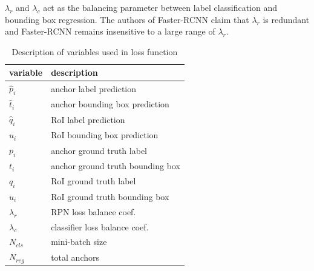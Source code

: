 $\lambda_r$ and $\lambda_c$ act as the balancing parameter  between label classification and bounding box regression. The authors of Faster-RCNN claim that $\lambda_r$ is redundant and Faster-RCNN remains insensitive to a large range of $\lambda_r$. 

\begin{table}[]
    \centering
    \begin{tabular}{| l | l |} \hline
variable & description \\ \hline \hline
$\hat{p}_i$ & anchor label prediction \\ \hline 
$\hat{t}_i$ & anchor bounding box prediction \\ \hline 
$\hat{q}_i$ & RoI label prediction \\ \hline 
$\hat{u}_i$ & RoI bounding box prediction \\ \hline 
${p}_i$ & anchor ground truth label \\ \hline 
${t}_i$ & anchor ground truth bounding box \\ \hline 
${q}_i$ & RoI ground truth label \\ \hline 
${u}_i$ & RoI ground truth bounding box  \\ \hline 
$\lambda_r $ & RPN loss balance coef. \\ \hline 
$\lambda_c $ & classifier loss balance coef.  \\ \hline 
$N_{cls}$ & mini-batch size  \\ \hline 
$N_{reg}$ & total anchors \\ \hline 
    \end{tabular}
    \caption{Description of variables used in loss function}
    \label{table:variable-list}
\end{table}{}